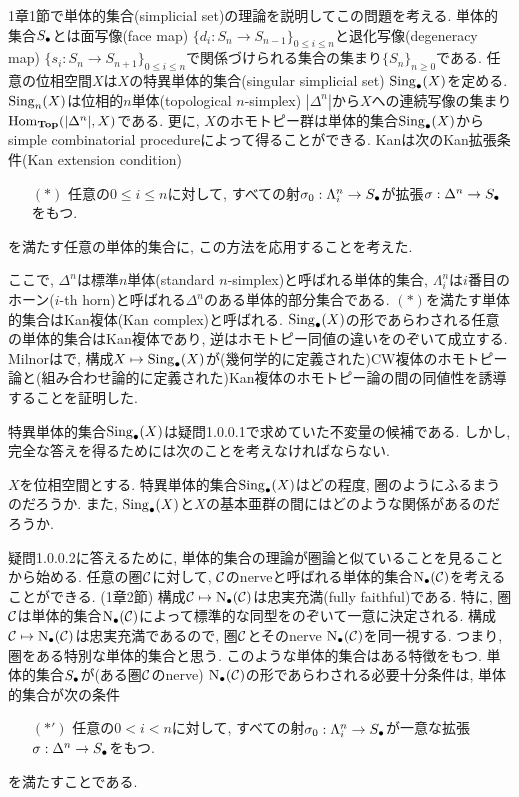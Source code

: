 \documentclass[uplatex, a4paper, 14Q, dvipdfmx]{jsreport}
\begin{document}
1章1節で単体的集合(simplicial set)の理論を説明してこの問題を考える. 
単体的集合$\S$とは面写像(face map) $\{d_i: S_n \to S_{n-1}\}_{0 \leq i \leq n}$と退化写像(degeneracy map) $\{s_i: S_n \to S_{n+1}\}_{0 \leq i \leq n}$で関係づけられる集合の集まり$\{S_n\}_{n \geq 0}$である. 
任意の位相空間$X$は$X$の特異単体的集合(singular simplicial set) $\Sing_\bullet(X)$を定める. 
$\Sing_n(X)$は位相的$n$単体(topological $n$-simplex) $|\Delta^n|$から$X$への連続写像の集まり$\Hom_{\Top}(|\Delta^n|,X)$である. 
更に, $X$のホモトピー群は単体的集合$\Sing_\bullet(X)$からsimple combinatorial procedureによって得ることができる. \cite[\href{https://kerodon.net/tag/00V2}{Tag 00V2}]{kerodon}
Kanは次のKan拡張条件(Kan extension condition)
\begin{itemize}
  \item[$(\ast)$] 任意の$0 \leq i \leq n$に対して, すべての射$\si_0: \Lambda^n_i \to \S$が拡張$\si: \Delta^n \to \S$をもつ.
\end{itemize} 
を満たす任意の単体的集合に, この方法を応用することを考えた. 

ここで, $\Delta^n$は標準$n$単体(standard $n$-simplex)と呼ばれる単体的集合, $\Lambda^n_i$は$i$番目のホーン($i$-th horn)と呼ばれる$\Delta^n$のある単体的部分集合である. 
$(\ast)$を満たす単体的集合はKan複体(Kan complex)と呼ばれる. 
$\Sing_\bullet(X)$の形であらわされる任意の単体的集合はKan複体であり, 逆はホモトピー同値の違いをのぞいて成立する. 
Milnorは\cite{MJ1}で, 構成$X \mt \Sing_\bullet(X)$が(幾何学的に定義された)CW複体のホモトピー論と(組み合わせ論的に定義された)Kan複体のホモトピー論の間の同値性を誘導することを証明した. \cite[\href{https://kerodon.net/tag/012Z}{Tag 012Z}]{kerodon}

特異単体的集合$\Sing_\bullet(X)$は疑問1.0.0.1で求めていた不変量の候補である. %
しかし, 完全な答えを得るためには次のことを考えなければならない. 

\begin{que}
  $X$を位相空間とする. 
  特異単体的集合$\Sing_\bullet(X)$はどの程度, 圏のようにふるまうのだろうか. 
  また, $\Sing_\bullet(X)$と$X$の基本亜群の間にはどのような関係があるのだろうか. 
\end{que}

疑問1.0.0.2に答えるために, 単体的集合の理論が圏論と似ていることを見ることから始める. 
任意の圏$\calC$に対して, $\calC$のnerveと呼ばれる単体的集合$\N(\calC)$を考えることができる. (1章2節)
構成$\calC \mt \N(\calC)$は忠実充満(fully faithful)である. 
特に, 圏$\calC$は単体的集合$\N(\calC)$によって標準的な同型をのぞいて一意に決定される. 
構成$\calC \mt \N(\calC)$は忠実充満であるので, 圏$\calC$とそのnerve $\N(\calC)$を同一視する. 
つまり, 圏をある特別な単体的集合と思う. 
このような単体的集合はある特徴をもつ. 
単体的集合$\S$が(ある圏$\calC$のnerve) $\N(\calC)$の形であらわされる必要十分条件は, 単体的集合が次の条件 
\begin{itemize}
  \item[$(\ast')$] 任意の$0 < i < n$に対して, すべての射$\si_0: \Lambda^n_i \to \S$が一意な拡張$\si: \Delta^n \to \S$をもつ. 
\end{itemize}
を満たすことである.
\end{document}
